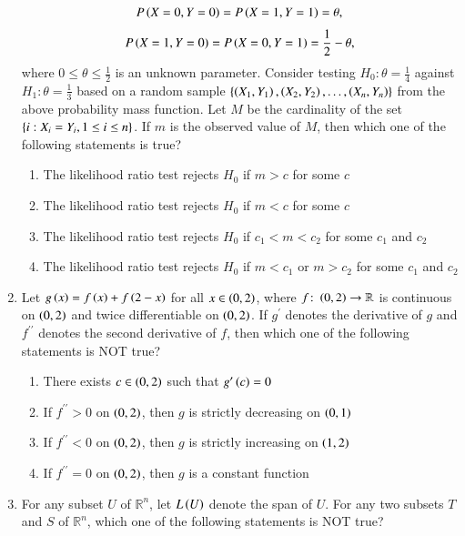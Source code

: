\documentclass[journal,12pt,onecolumn]{IEEEtran}
\theoremstyle{remark}
\begin{document}
\begin{enumerate}
    \begin{align}
    P\left(X=0, Y=0\right) = P\left(X=1, Y=1\right) = \theta,
    \end{align}
    \begin{align}
    P\left(X=1, Y=0\right) = P\left(X=0, Y=1\right) = \frac{1}{2} - \theta,
\end{align}
    where $0 \leq \theta \leq \frac{1}{2}$ is an unknown parameter. Consider testing $H_0: \theta = \frac{1}{4}$
    against $H_1: \theta = \frac{1}{3}$ based on a random sample $\{\left(X_1, Y_1\right), \left(X_2, Y_2\right), \dots , \left(X_n, Y_n\right)\}$
    from the above probability mass function. Let $M$ be the cardinality of the set
    $\left\{i: X_i = Y_i, 1 \leq i \leq n\right\}$. If $m$ is the observed value of $M$, then which one of the
    following statements is true?

    \begin{enumerate}
        \item The likelihood ratio test rejects $H_0$ if $m > c$ for some $c$
        \item The likelihood ratio test rejects $H_0$ if $m < c$ for some $c$
        \item The likelihood ratio test rejects $H_0$ if $c_1 < m < c_2$ for some $c_1$ and $c_2$
        \item The likelihood ratio test rejects $H_0$ if $m < c_1$ or $m > c_2$ for some $c_1$ and $c_2$\\
    \end{enumerate}
    \item  Let $g\left(x\right) = f\left(x\right) + f\left(2-x\right)$ for all $x \in \left(0,2\right)$, where $f \colon\left(0,2\right) \to \mathbb{R}$ is continuous on $\left(0,2\right)$ and twice differentiable on $\left(0,2\right)$. If $g^\prime$ denotes the derivative of $g$ and $f^{\prime\prime}$ denotes the second derivative of $f$, then which one of the following statements is NOT true?  


    \begin{enumerate}
        \item There exists $c \in \left(0,2\right)$ such that $g^\prime\left(c\right) = 0$
        \item If $f^{\prime\prime} > 0$ on $\left(0,2\right)$, then $g$ is strictly decreasing on $\left(0,1\right)$
        \item  If $f^{\prime\prime} < 0$ on $\left(0,2\right)$, then $g$ is strictly increasing on $\left(1,2\right)$
        \item If $f^{\prime\prime} = 0$ on $\left(0,2\right)$, then $g$ is a constant function\\
    \end{enumerate}
    \item For any subset $U$ of $\mathbb{R}^n$, let $L\left(U\right)$ denote the span of $U$. For any two subsets $T$ and $S$ of $\mathbb{R}^n$, which one of the following statements is NOT true?


\end{enumerate}
\end{document}
